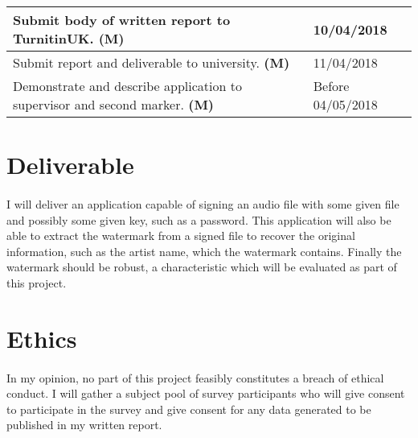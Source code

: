 \documentclass{article}
\begin{document}
\begin{table}[htbp]
\begin{tabularx}{\textwidth}{|X|l|}
			Submit body of written report to TurnitinUK. \textbf{(M)}                                                                   & 10/04/2018             \\ \hline
			Submit report and deliverable to university. \textbf{(M)}                                                                   & 11/04/2018             \\ \hline
			Demonstrate and describe application to supervisor and second marker. \textbf{(M)}                                          & Before 04/05/2018      \\ \hline
		\end{tabularx}
	\end{table}
	\section{Deliverable}
	\paragraph{}
	I will deliver an application capable of signing an audio file with some given file and possibly some given key, such as a password. This application will also be able to extract the watermark from a signed file to recover the original information, such as the artist name, which the watermark contains. Finally the watermark should be robust, a characteristic which will be evaluated as part of this project.
	
	\section{Ethics}
	\paragraph{}
	In my opinion, no part of this project feasibly constitutes a breach of ethical conduct. I will gather a subject pool of survey participants who will give consent to participate in the survey and give consent for any data generated to be published in my written report.
	
\end{document}
